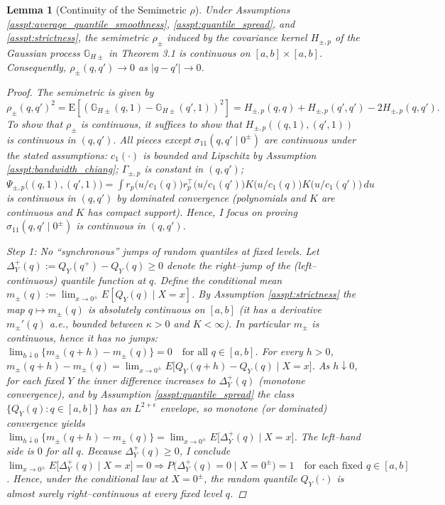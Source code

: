 \documentclass[12pt]{article}
\newtheorem{lemma}{Lemma}
\begin{document}
\begin{lemma}[Continuity of the Semimetric \(\rho\)] \label{lem:semi_metric_continuity}
Under Assumptions \ref{asspt:average_quantile_smoothness}, \ref{asspt:quantile_spread}, and \ref{asspt:strictness}, the semimetric \(\rho_\pm\) induced by the covariance kernel \(H_{\pm,p}\) of the Gaussian process \(\mathbb{G}_{H\pm}\) in Theorem 3.1 is continuous on \([a,b] \times [a,b]\). Consequently, \(\rho_\pm(q,q') \to 0\) as \(|q-q'| \to 0\).
\begin{proof}
The semimetric is given by  
\[
\rho_\pm(q,q')^2 = \mathrm{E}\!\left[(\mathbb G_{H\pm}(q,1)-\mathbb G_{H\pm}(q',1))^2\right] = H_{\pm,p}(q,q) + H_{\pm,p}(q',q') - 2 H_{\pm,p}(q,q').
\]
To show that \(\rho_\pm\) is continuous, it suffices to show that \(H_{\pm,p}((q,1),(q',1))\) is continuous in \((q,q')\). All pieces except \(\sigma_{11}(q,q'\mid 0^\pm)\) are continuous under the stated assumptions: \(c_1(\cdot)\) is bounded and Lipschitz by Assumption \ref{asspt:bandwidth_chiang}; \(\Gamma_{\pm,p}\) is constant in \((q,q')\); \(\Psi_{\pm,p}\big((q,1),(q',1)\big)=\int r_p\!\big(u/c_1(q)\big)r_p^\top\!\big(u/c_1(q')\big)K\!\big(u/c_1(q)\big)K\!\big(u/c_1(q')\big)\,du\)  
  is continuous in \((q,q')\) by dominated convergence (polynomials and \(K\) are continuous and \(K\) has compact support). Hence, I focus on proving \(\sigma_{11}(q,q'\mid 0^\pm)\) is continuous in $(q, q')$.

\emph{Step 1: No “synchronous” jumps of random quantiles at fixed levels.}  
Let \(\Delta^+_{Y}(q):=Q_Y(q^+)-Q_Y(q)\ge 0\) denote the right–jump of the (left–continuous) quantile function at \(q\). Define the conditional mean  
\(m_\pm(q):=\lim_{x\to 0^\pm}E[Q_Y(q)\mid X=x]\).  
By Assumption \ref{asspt:strictness} the map \(q\mapsto m_\pm(q)\) is absolutely continuous on \([a,b]\) (it has a derivative \(m_\pm'(q)\) a.e., bounded between \(\kappa>0\) and \(K<\infty\)). In particular \(m_\pm\) is continuous, hence it has no jumps:  
\(\lim_{h\downarrow 0}\{m_\pm(q+h)-m_\pm(q)\}=0\quad\text{for all }q\in[a,b]\).  
For every \(h>0\),  
\(m_\pm(q+h)-m_\pm(q)=\lim_{x\to 0^\pm}E\!\big[Q_Y(q+h)-Q_Y(q)\mid X=x\big]\).  
As \(h\downarrow 0\), for each fixed \(Y\) the inner difference increases to \(\Delta^+_{Y}(q)\) (monotone convergence), and by Assumption \ref{asspt:quantile_spread} the class \(\{Q_Y(q):q\in[a,b]\}\) has an \(L^{2+\epsilon}\) envelope, so monotone (or dominated) convergence yields  
\(\lim_{h\downarrow 0}\{m_\pm(q+h)-m_\pm(q)\} =\lim_{x\to 0^\pm}E\!\big[\Delta^+_{Y}(q)\mid X=x\big]\).  
The left–hand side is \(0\) for all \(q\). Because \(\Delta^+_{Y}(q)\ge 0\), I conclude  
\(\lim_{x\to 0^\pm}E\!\big[\Delta^+_{Y}(q)\mid X=x\big]=0\Rightarrow P\!\big(\Delta^+_{Y}(q)=0\mid X=0^\pm\big)=1\quad\text{for each fixed }q\in[a,b]\).  
Hence, under the conditional law at \(X=0^\pm\), the random quantile \(Q_Y(\cdot)\) is almost surely right–continuous at every fixed level \(q\). 


\end{proof}
\end{lemma}
\end{document}
